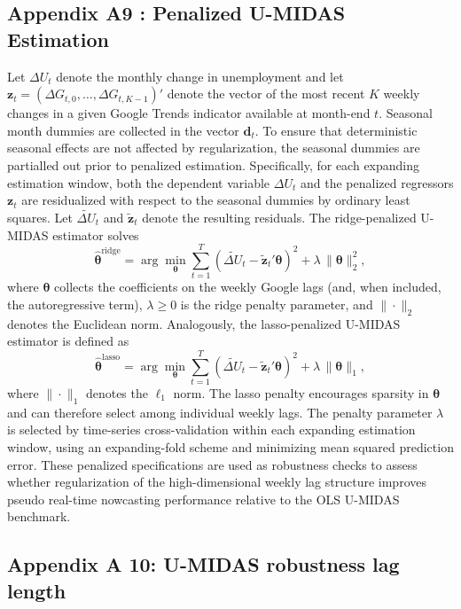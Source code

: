 \documentclass[12pt,a4paper]{article}
\begin{document}
\subsection{Appendix A9 : Penalized U-MIDAS Estimation}
Let $\Delta U_t$ denote the monthly change in unemployment and let
$\mathbf{z}_t = (\Delta G_{t,0}, \dots, \Delta G_{t,K-1})'$ denote the vector
of the most recent $K$ weekly changes in a given Google Trends indicator
available at month-end $t$.
Seasonal month dummies are collected in the vector $\mathbf{d}_t$.
To ensure that deterministic seasonal effects are not affected by
regularization, the seasonal dummies are partialled out prior to penalized
estimation. Specifically, for each expanding estimation window, both the
dependent variable $\Delta U_t$ and the penalized regressors $\mathbf{z}_t$
are residualized with respect to the seasonal dummies by ordinary least
squares. Let $\tilde{\Delta U}_t$ and $\tilde{\mathbf{z}}_t$ denote the
resulting residuals.
The ridge-penalized U-MIDAS estimator solves
\begin{equation}
\hat{\boldsymbol{\theta}}^{\text{ridge}}
=
\arg\min_{\boldsymbol{\theta}}
\sum_{t=1}^{T}
\left(
\tilde{\Delta U}_t - \tilde{\mathbf{z}}_t' \boldsymbol{\theta}
\right)^2
+
\lambda \, \|\boldsymbol{\theta}\|_2^2,
\end{equation}
where $\boldsymbol{\theta}$ collects the coefficients on the weekly Google
lags (and, when included, the autoregressive term), $\lambda \ge 0$ is the
ridge penalty parameter, and $\|\cdot\|_2$ denotes the Euclidean norm.
Analogously, the lasso-penalized U-MIDAS estimator is defined as
\begin{equation}
\hat{\boldsymbol{\theta}}^{\text{lasso}}
=
\arg\min_{\boldsymbol{\theta}}
\sum_{t=1}^{T}
\left(
\tilde{\Delta U}_t - \tilde{\mathbf{z}}_t' \boldsymbol{\theta}
\right)^2
+
\lambda \, \|\boldsymbol{\theta}\|_1,
\end{equation}
where $\|\cdot\|_1$ denotes the $\ell_1$ norm. The lasso penalty encourages
sparsity in $\boldsymbol{\theta}$ and can therefore select among individual
weekly lags.
The penalty parameter $\lambda$ is selected by time-series cross-validation
within each expanding estimation window, using an expanding-fold scheme and
minimizing mean squared prediction error.
These penalized specifications are used as robustness checks to assess
whether regularization of the high-dimensional weekly lag structure improves
pseudo real-time nowcasting performance relative to the OLS U-MIDAS
benchmark.


\subsection{Appendix A 10: U-MIDAS robustness lag length}
\end{document}
